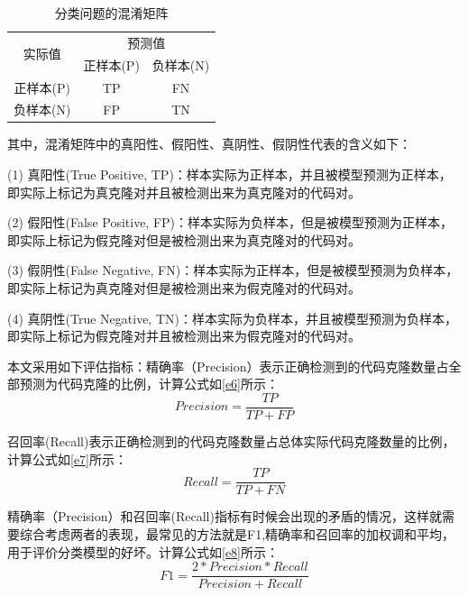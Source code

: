 \begin{table}[htp]
  \centering
  \caption{分类问题的混淆矩阵} 
  \label{tab:ConfusionMatrix}
  \renewcommand{\arraystretch}{1.1}
  \begin{tabular*}{0.7\textwidth}{@{\extracolsep{\fill}}ccc}
  \toprule
  \multirow{2}{*}{实际值} & \multicolumn{2}{c}{预测值} \\
  \cmidrule{2-3} 
  \multirow{2}{*}{} & 正样本(P) & 负样本(N) \\
  \midrule
    正样本(P)			&TP	  &FN		 \\
    负样本(N)			&FP		&TN		 \\
  \bottomrule
  \end{tabular*}
\end{table}

其中，混淆矩阵中的真阳性、假阳性、真阴性、假阴性代表的含义如下：

(1) 真阳性(True Positive, TP)：样本实际为正样本，并且被模型预测为正样本，即实际上标记为真克隆对并且被检测出来为真克隆对的代码对。
 
(2) 假阳性(False Positive, FP)：样本实际为负样本，但是被模型预测为正样本，即实际上标记为假克隆对但是被检测出来为真克隆对的代码对。
 
(3) 假阴性(False Negative, FN)：样本实际为正样本，但是被模型预测为负样本，即实际上标记为真克隆对但是被检测出来为假克隆对的代码对。
 
(4) 真阴性(True Negative, TN)：样本实际为负样本，并且被模型预测为负样本，即实际上标记为假克隆对并且被检测出来为假克隆对的代码对。

本文采用如下评估指标：精确率（Precision）表示正确检测到的代码克隆数量占全部预测为代码克隆的比例，计算公式如\ref{e6}所示：
\begin{equation}\label{e6}
  Precision = \frac{TP}{TP+FP} 
\end{equation}

召回率(Recall)表示正确检测到的代码克隆数量占总体实际代码克隆数量的比例，计算公式如\ref{e7}所示：
\begin{equation}\label{e7}
  Recall = \frac{TP}{TP+FN} 
\end{equation}

精确率（Precision）和召回率(Recall)指标有时候会出现的矛盾的情况，这样就需要综合考虑两者的表现，最常见的方法就是F1,精确率和召回率的加权调和平均，用于评价分类模型的好坏。计算公式如\ref{e8}所示：
\begin{equation}\label{e8}
  F1 = \frac{2*Precision*Recall}{Precision+Recall} 
\end{equation}

